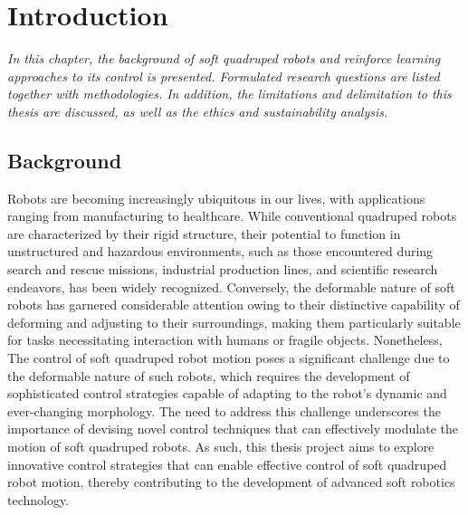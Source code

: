 \chapter{Introduction}
\label{chap1}
\textit{In this chapter, the background of soft quadruped robots and reinforce learning approaches to its control is presented. Formulated research questions are listed together with methodologies. In addition, the limitations and delimitation to this thesis are discussed, as well as the ethics and sustainability analysis.}

\section{Background}
Robots are becoming increasingly ubiquitous in our lives, with applications ranging from manufacturing to healthcare\cite{wangCurrentResearchesFuture2018}. While conventional quadruped robots are characterized by their rigid structure, their potential to function in unstructured and hazardous environments, such as those encountered during search and rescue missions\cite{hawkesSoftRobotThat2017}, industrial production lines\cite{gehringANYmalFieldSolving2021}, and scientific research endeavors\cite{hewingLearningbasedModelPredictive2020}, has been widely recognized\cite{mengReviewQuadrupedRobots2016}. Conversely, the deformable nature of soft robots has garnered considerable attention owing to their distinctive capability of deforming and adjusting to their surroundings, making them particularly suitable for tasks necessitating interaction with humans or fragile objects\cite{muralidharanSoftQuadrupedRobot2021}. Nonetheless, The control of soft quadruped robot motion poses a significant challenge due to the deformable nature of such robots\cite{wangControlStrategiesSoft2022}, which requires the development of sophisticated control strategies capable of adapting to the robot's dynamic and ever-changing morphology\cite{wangControlStrategiesSoft2022}. The need to address this challenge underscores the importance of devising novel control techniques that can effectively modulate the motion of soft quadruped robots. As such, this thesis project aims to explore innovative control strategies that can enable effective control of soft quadruped robot motion, thereby contributing to the development of advanced soft robotics technology.

